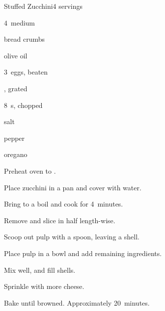 \begin{recipe}{Stuffed Zucchini}{}{4 servings}

\begin{ingredients}
\item 4~medium 
\item \C{\half} bread crumbs
\item {} olive oil
\item 3~eggs, beaten
\item \C{\half} , grated
\item 8~s, chopped
\item salt
\item pepper
\item oregano
\end{ingredients}

\begin{directions}
\item Preheat oven to .
\item Place zucchini in a pan and cover with water.
\item Bring to a boil and cook for 4~minutes.
\item Remove and slice in half length-wise.
\item Scoop out pulp with a spoon, leaving a shell.
\item Place pulp in a bowl and add remaining ingredients.
\item Mix well, and fill shells.
\item Sprinkle with more cheese.
\item Bake until browned. Approximately 20~minutes.
\end{directions}

\end{recipe}
